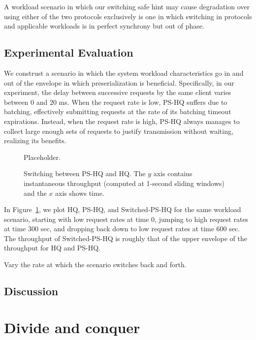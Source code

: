 \documentclass[twocolumn,10pt]{article}
\begin{document}
A workload scenario in which our switching safe hint may cause
degradation over using either of the two protocols exclusively is one in
which switching in protocols and applicable workloads is in perfect
synchrony but out of phase.



\subsection{Experimental Evaluation}

We construst a scenario in which the system workload characteristics go
in and out of the envelope in which preserialization is beneficial.
Specifically, in our experiment, the delay between successive requests
by the same client varies between $0$ and $20$ ms.  When the request
rate is low, PS-HQ suffers due to batching, effectively submitting
requests at the rate of its batching timeout expirations.  Instead, when
the request rate is high, PS-HQ always manages to collect large enough
sets of requests to justify transmission without waiting, realizing its
benefits.

\begin{figure}
\centering
Placeholder.
\caption{Switching between PS-HQ and HQ. The $y$ axis contains
  instantaneous throughput (computed at 1-second sliding windows) and
  the $x$ axis shows time.}
\label{fig:pshqswitcher}
\end{figure}

In Figure~\ref{fig:pshqswitcher}, we plot HQ, PS-HQ, and Switched-PS-HQ
for the same workload scenario, starting with low request rates at time
$0$, jumping to high request rates at time $300$ sec, and dropping back
down to low request rates at time $600$ sec.  The throughput of
Switched-PS-HQ is roughly that of the upper envelope of the throughput
for HQ and PS-HQ.


Vary the rate at which the scenario switches back and forth.



\subsection{Discussion}





\section{Divide and conquer}
\end{document}
